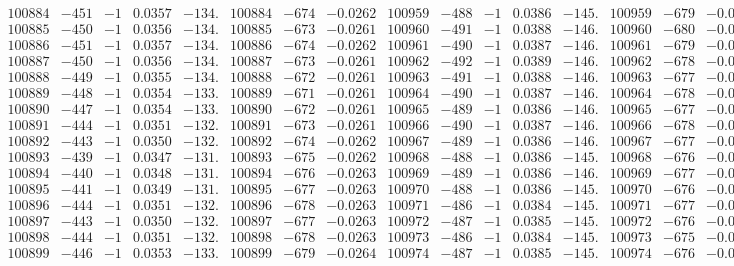 \documentclass[11pt,reqno,a4letter]{article}
\numberwithin{figure}{section}
\numberwithin{table}{section}
\theoremstyle{plain}
\numberwithin{theorem}{section}
\theoremstyle{definition}
\begin{document}
\begin{table}[ht!]
\begin{equation*}
{\begin{array}{ccccc|ccc||ccccc|ccc}
100884 & -451 & -1 & 0.0357 & -134. & 100884 & -674 & -0.0262 & 100959 & -488 & -1 & 0.0386 & -145. & 100959 & -679 & -0.0264  \\
100885 & -450 & -1 & 0.0356 & -134. & 100885 & -673 & -0.0261 & 100960 & -491 & -1 & 0.0388 & -146. & 100960 & -680 & -0.0264  \\
100886 & -451 & -1 & 0.0357 & -134. & 100886 & -674 & -0.0262 & 100961 & -490 & -1 & 0.0387 & -146. & 100961 & -679 & -0.0264  \\
100887 & -450 & -1 & 0.0356 & -134. & 100887 & -673 & -0.0261 & 100962 & -492 & -1 & 0.0389 & -146. & 100962 & -678 & -0.0263  \\
100888 & -449 & -1 & 0.0355 & -134. & 100888 & -672 & -0.0261 & 100963 & -491 & -1 & 0.0388 & -146. & 100963 & -677 & -0.0263  \\
100889 & -448 & -1 & 0.0354 & -133. & 100889 & -671 & -0.0261 & 100964 & -490 & -1 & 0.0387 & -146. & 100964 & -678 & -0.0263  \\
100890 & -447 & -1 & 0.0354 & -133. & 100890 & -672 & -0.0261 & 100965 & -489 & -1 & 0.0386 & -146. & 100965 & -677 & -0.0263  \\
100891 & -444 & -1 & 0.0351 & -132. & 100891 & -673 & -0.0261 & 100966 & -490 & -1 & 0.0387 & -146. & 100966 & -678 & -0.0263  \\
100892 & -443 & -1 & 0.0350 & -132. & 100892 & -674 & -0.0262 & 100967 & -489 & -1 & 0.0386 & -146. & 100967 & -677 & -0.0263  \\
100893 & -439 & -1 & 0.0347 & -131. & 100893 & -675 & -0.0262 & 100968 & -488 & -1 & 0.0386 & -145. & 100968 & -676 & -0.0262  \\
100894 & -440 & -1 & 0.0348 & -131. & 100894 & -676 & -0.0263 & 100969 & -489 & -1 & 0.0386 & -146. & 100969 & -677 & -0.0263  \\
100895 & -441 & -1 & 0.0349 & -131. & 100895 & -677 & -0.0263 & 100970 & -488 & -1 & 0.0386 & -145. & 100970 & -676 & -0.0262  \\
100896 & -444 & -1 & 0.0351 & -132. & 100896 & -678 & -0.0263 & 100971 & -486 & -1 & 0.0384 & -145. & 100971 & -677 & -0.0263  \\
100897 & -443 & -1 & 0.0350 & -132. & 100897 & -677 & -0.0263 & 100972 & -487 & -1 & 0.0385 & -145. & 100972 & -676 & -0.0262  \\
100898 & -444 & -1 & 0.0351 & -132. & 100898 & -678 & -0.0263 & 100973 & -486 & -1 & 0.0384 & -145. & 100973 & -675 & -0.0262  \\
100899 & -446 & -1 & 0.0353 & -133. & 100899 & -679 & -0.0264 & 100974 & -487 & -1 & 0.0385 & -145. & 100974 & -676 & -0.0262  \\

\end{array}}
\end{equation*}
\end{table}
\end{document}
